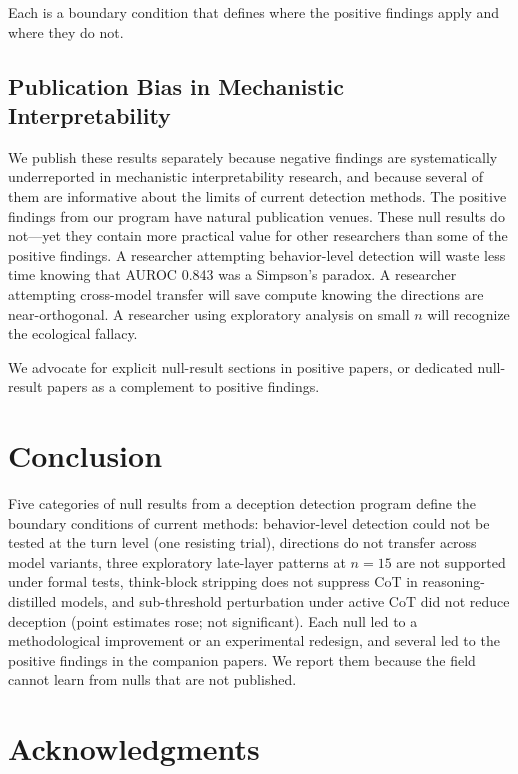 \documentclass[11pt,letterpaper]{article}
\begin{document}
Each is a boundary condition that defines where the positive findings apply and where they do not.

\subsection{Publication Bias in Mechanistic Interpretability}

We publish these results separately because negative findings are systematically underreported in
mechanistic interpretability research, and because several of them are informative about the limits
of current detection methods. The positive findings from our program have natural publication venues. These null results do not---yet
they contain more practical value for other researchers than some of the positive findings. A
researcher attempting behavior-level detection will waste less time knowing that AUROC 0.843 was a
Simpson's paradox. A researcher attempting cross-model transfer will save compute knowing the
directions are near-orthogonal. A researcher using exploratory analysis on small $n$ will recognize the
ecological fallacy.

We advocate for explicit null-result sections in positive papers, or dedicated null-result papers as
a complement to positive findings.

\section{Conclusion}\label{sec:conclusion}

Five categories of null results from a deception detection program define the boundary conditions of
current methods: behavior-level detection could not be tested at the turn level (one resisting trial), directions do not
transfer across model variants, three exploratory late-layer patterns at $n=15$ are not supported
under formal tests, think-block stripping does not suppress CoT in reasoning-distilled models, and
sub-threshold perturbation under active CoT did not reduce deception (point estimates rose; not
significant). Each null led to a methodological
improvement or an experimental redesign, and several led to the positive findings in the companion
papers. We report them because the field cannot learn
from nulls that are not published.

\section*{Acknowledgments}
\end{document}
